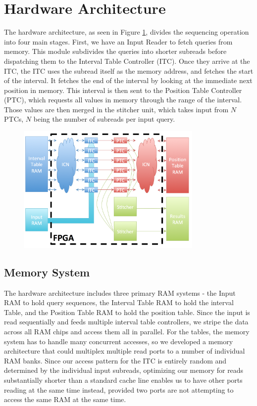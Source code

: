 \documentclass[11pt]{article}
\begin{document}
\section{Hardware Architecture}

The hardware architecture, as seen in Figure \ref{arch}, divides the sequencing operation into four main stages.  First, we have an Input Reader to fetch queries from memory.  This module subdivides the queries into shorter subreads before dispatching them to the Interval Table Controller (ITC).  Once they arrive at the ITC, the ITC uses the subread itself as the memory address, and fetches the start of the interval.  It fetches the end of the interval by looking at the immediate next position in memory.  This interval is then sent to the Position Table Controller (PTC), which requests all values in memory through the range of the interval.  Those values are then merged in the stitcher unit, which takes input from $N$ PTCs, $N$ being the number of subreads per input query.
\begin{figure}[ht!]
\centering
\includegraphics[width=90mm]{architecture.png}
\caption{}
\label{arch}
\end{figure}


\subsection{Memory System}
The hardware architecture includes three primary RAM systems - the Input RAM to hold query sequences, the Interval Table RAM to hold the interval Table, and the Position Table RAM to hold the position table.  Since the input is read sequentially and feeds multiple interval table controllers, we  stripe the data across all RAM chips and access them all in parallel.  For the tables, the memory system has to handle many concurrent accesses, so we developed a memory architecture that could multiplex multiple read ports to a number of individual RAM banks.  Since our access pattern for the ITC is entirely random and determined by the individual input subreads, optimizing our memory for reads substantially shorter than a standard cache line enables us to have other ports reading at the same time instead, provided two ports are not attempting to access the same RAM at the same time.
\end{document}
